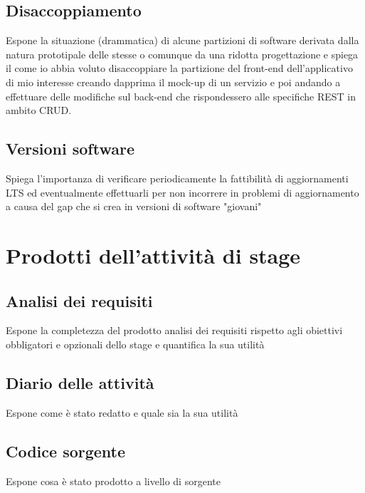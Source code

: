 \subsection{Disaccoppiamento}
Espone la situazione (drammatica) di alcune partizioni di software derivata dalla natura prototipale delle stesse o comunque da una ridotta progettazione e spiega il come io abbia voluto disaccoppiare la partizione del front-end dell'applicativo di mio interesse creando dapprima il mock-up di un servizio e poi andando a effettuare delle modifiche sul back-end che rispondessero alle specifiche REST in ambito CRUD.

\subsection{Versioni software}
Spiega l'importanza di verificare periodicamente la fattibilità di aggiornamenti LTS ed eventualmente effettuarli per non incorrere in problemi di aggiornamento a causa del gap che si crea in versioni di software "giovani"

\section{Prodotti dell'attività di stage}
\subsection{Analisi dei requisiti}
Espone la completezza del prodotto analisi dei requisiti rispetto agli obiettivi obbligatori e opzionali dello stage e quantifica la sua utilità

\subsection{Diario delle attività}
Espone come è stato redatto e quale sia la sua utilità

\subsection{Codice sorgente}
Espone cosa è stato prodotto a livello di sorgente